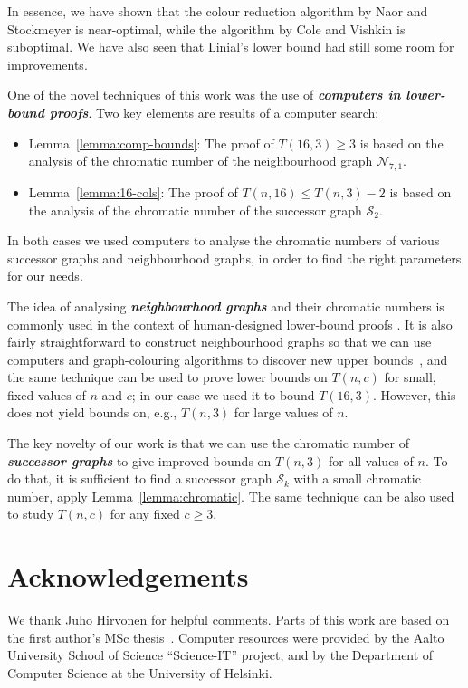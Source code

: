 \documentclass[a4paper,11pt]{article}
\theoremstyle{remark}
\newcommand{\cS}{\mathcal{S}}
\begin{document}
In essence, we have shown that the colour reduction algorithm by Naor and Stockmeyer is near-optimal, while the algorithm by Cole and Vishkin is suboptimal. We have also seen that Linial's lower bound had still some room for improvements.

One of the novel techniques of this work was the use of \emph{\textbf{computers in lower-bound proofs}}. Two key elements are results of a computer search:
\begin{itemize}
    \item Lemma~\ref{lemma:comp-bounds}: The proof of $T(16,3) \ge 3$ is based on the analysis of the chromatic number of the neighbourhood graph $\mathcal{N}_{7,1}$.
    \item Lemma~\ref{lemma:16-cols}: The proof of $T(n,16) \le T(n, 3) - 2$ is based on the analysis of the chromatic number of the successor graph $\cS_2$.
\end{itemize}
In both cases we used computers to analyse the chromatic numbers of various successor graphs and neighbourhood graphs, in order to find the right parameters for our needs.

The idea of analysing \emph{\textbf{neighbourhood graphs}} and their chromatic numbers is commonly used in the context of human-designed lower-bound proofs \cite{linial92locality,naor91lower,kuhn06complexity,fraigniaud07distributed}. It is also fairly straightforward to construct neighbourhood graphs so that we can use computers and graph-colouring algorithms to discover new upper bounds~\cite{rybicki11msc}, and the same technique can be used to prove lower bounds on $T(n,c)$ for small, fixed values of $n$ and $c$; in our case we used it to bound $T(16,3)$. However, this does not yield bounds on, e.g., $T(n,3)$ for large values of $n$.

The key novelty of our work is that we can use the chromatic number of \emph{\textbf{successor graphs}} to give improved bounds on $T(n,3)$ for all values of $n$. To do that, it is sufficient to find a successor graph $\cS_k$ with a small chromatic number, apply Lemma~\ref{lemma:chromatic}. The same technique can be also used to study $T(n,c)$ for any fixed $c \ge 3$.


\section*{Acknowledgements}

We thank Juho Hirvonen for helpful comments. Parts of this work are based on the first author's MSc thesis~\cite{rybicki11msc}. Computer resources were provided by the Aalto University School of Science ``Science-IT'' project, and by the Department of Computer Science at the University of Helsinki.



\end{document}
